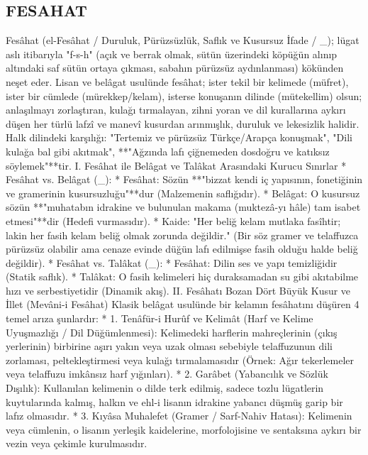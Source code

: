 \documentclass[11pt,a4paper]{article}
\begin{document}
\subsection{FESAHAT}



Fesâhat (el-Fesâhat / Duruluk, Pürüzsüzlük, Saflık ve Kusursuz İfade / _{}); lügat aslı itibarıyla "f-s-h" (açık ve berrak olmak, sütün üzerindeki köpüğün alınıp altındaki saf sütün ortaya çıkması, sabahın pürüzsüz aydınlanması) kökünden neşet eder.
Lisan ve belâgat usulünde fesâhat; ister tekil bir kelimede (müfret), ister bir cümlede (mürekkep/kelam), isterse konuşanın dilinde (mütekellim) olsun; anlaşılmayı zorlaştıran, kulağı tırmalayan, zihni yoran ve dil kurallarına aykırı düşen her türlü lafzî ve manevî kusurdan arınmışlık, duruluk ve lekesizlik halidir.
Halk dilindeki karşılığı: "Tertemiz ve pürüzsüz Türkçe/Arapça konuşmak", "Dili kulağa bal gibi akıtmak", **"Ağzında lafı çiğnemeden dosdoğru ve katıksız söylemek"**tir.
I. Fesâhat ile Belâgat ve Talâkat Arasındaki Kurucu Sınırlar
 * Fesâhat vs. Belâgat (_{}):
   * Fesâhat: Sözün **"bizzat kendi iç yapısının, fonetiğinin ve gramerinin kusursuzluğu"**dur (Malzemenin saflığıdır).
   * Belâgat: O kusursuz sözün **"muhatabın idrakine ve bulunulan makama (muktezâ-yı hâle) tam isabet etmesi"**dir (Hedefi vurmasıdır).
   * Kaide: "Her beliğ kelam mutlaka fasîhtir; lakin her fasih kelam beliğ olmak zorunda değildir." (Bir söz gramer ve telaffuzca pürüzsüz olabilir ama cenaze evinde düğün lafı edilmişse fasih olduğu halde beliğ değildir).
 * Fesâhat vs. Talâkat (_{}):
   * Fesâhat: Dilin ses ve yapı temizliğidir (Statik saflık).
   * Talâkat: O fasih kelimeleri hiç duraksamadan su gibi akıtabilme hızı ve serbestiyetidir (Dinamik akış).
II. Fesâhatı Bozan Dört Büyük Kusur ve İllet (Mevâni-i Fesâhat)
Klasik belâgat usulünde bir kelamın fesâhatını düşüren 4 temel arıza şunlardır:
 * 1. Tenâfür-i Hurûf ve Kelimât (Harf ve Kelime Uyuşmazlığı / Dil Düğümlenmesi):
   Kelimedeki harflerin mahreçlerinin (çıkış yerlerinin) birbirine aşırı yakın veya uzak olması sebebiyle telaffuzunun dili zorlaması, peltekleştirmesi veya kulağı tırmalamasıdır (Örnek: Ağır tekerlemeler veya telaffuzu imkânsız harf yığınları).
 * 2. Garâbet (Yabancılık ve Sözlük Dışılık):
   Kullanılan kelimenin o dilde terk edilmiş, sadece tozlu lügatlerin kuytularında kalmış, halkın ve ehl-i lisanın idrakine yabancı düşmüş garip bir lafız olmasıdır.
 * 3. Kıyâsa Muhalefet (Gramer / Sarf-Nahiv Hatası):
   Kelimenin veya cümlenin, o lisanın yerleşik kaidelerine, morfolojisine ve sentaksına aykırı bir vezin veya çekimle kurulmasıdır.
\end{document}

